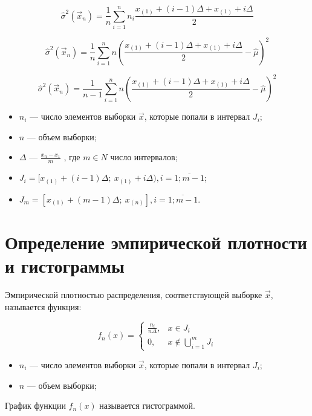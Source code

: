 \documentclass[a4paper,11pt,russian]{extreport}
\begin{document}
	\begin{equation}
	\hat{\sigma}^2(\vec{x}_n) = \frac{1}{n} \sum_{i = 1}^{n}n_{i}\frac{x_{(1)}+(i-1)\Delta+x_{(1)}+i\Delta}{2}
	\end{equation}
	
	\begin{equation}
	\hat{\sigma}^2(\vec{x}_n) = \frac{1}{n} \sum_{i = 1}^{n}n(\frac{x_{(1)}+(i-1)\Delta+x_{(1)}+i\Delta}{2} - \hat{\mu})^2
	\end{equation}
	
	
	\begin{equation}
	\hat{\sigma}^2(\vec{x}_n) = \frac{1}{n-1} \sum_{i = 1}^{n}n(\frac{x_{(1)}+(i-1)\Delta+x_{(1)}+i\Delta}{2} - \hat{\mu})^2
	\end{equation}
	
	\begin{itemize}
		\item $n_{i}$ --- число элементов выборки $\vec{x}$, которые попали в интервал $J_{i}$;
		\item $n$ --- объем выборки;
		\item $\Delta$ --- $\frac{x_{n}-x_{1}}{m}$ , где $m \in N$ число интервалов;
		\item $J_{i}=[x_{(1)}+(i-1)\Delta;\ x_{(1)}+i\Delta), i = \overline{1;m-1}$;
		\item $J_{m}=[x_{(1)}+(m-1)\Delta;\ x_{(n)}], i = \overline{1;m-1}$.
	\end{itemize}
	\fi
	
	\section{Определение эмпирической плотности и гистограммы}
	Эмпирической плотностью распределения, соответствующей выборке $\vec{x}$, называется функция:
	
	\begin{equation}
	f_n(x) = \begin{cases} \frac{n_i}{n\Delta}, & x \in J_i \\ 0, & x \notin \bigcup\limits_{i=1}^{m}J_i \end{cases}
	\end{equation}
	
	\begin{itemize}
		\item $n_{i}$ --- число элементов выборки $\vec{x}$, которые попали в интервал $J_{i}$;
		\item $n$ --- объем выборки;
	\end{itemize}
	График функции $f_n(x)$ называется гистограммой.
	
\end{document}
